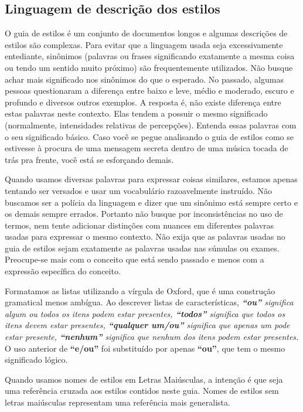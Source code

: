 \subsection*{Linguagem de descrição dos estilos}
O guia de estilos é um conjunto de documentos longos e algumas descrições de estilos são complexas. Para evitar que a linguagem usada seja excessivamente entediante, sinônimos (palavras ou frases significando exatamente a mesma coisa ou tendo um sentido muito próximo) são frequentemente utilizados. Não busque achar mais significado nos sinônimos do que o esperado. No passado, algumas pessoas questionaram a diferença entre baixo e leve, médio e moderado, escuro e profundo e diversos outros exemplos. A resposta é, não existe diferença entre estas palavras neste contexto. Elas tendem a possuir o mesmo significado (normalmente, intensidades relativas de percepções). Entenda essas palavras com o seu significado básico. Caso você se pegue analisando o guia de estilos como se estivesse à procura de uma mensagem secreta dentro de uma música tocada de trás pra frente, você está se esforçando demais.

Quando usamos diversas palavras para expressar coisas similares, estamos apenas tentando ser versados e usar um vocabulário razoavelmente instruído. Não buscamos ser a polícia da linguagem e dizer que um sinônimo está sempre certo e os demais sempre errados. Portanto não busque por inconsistências no uso de termos, nem tente adicionar distinções com nuances em diferentes palavras usadas para expressar o mesmo contexto. Não exija que as palavras usadas no guia de estilos sejam exatamente as palavras usadas nas súmulas ou exames. Preocupe-se mais com o conceito que está sendo passado e menos com a expressão específica do conceito.

Formatamos as listas utilizando a vírgula de Oxford, que é uma construção gramatical menos ambígua. Ao descrever listas de características, \textit{\textbf{“ou”} significa algum ou todos os itens podem estar presentes, \textbf{“todos”} significa que todos os itens devem estar presentes, \textbf{“qualquer um/ou”} significa que apenas um pode estar presente, \textbf{“nenhum”} significa que nenhum dos itens podem estar presentes.} O uso anterior de \textbf{“e/ou”} foi substituído por apenas \textbf{“ou”}, que tem o mesmo significado lógico.

Quando usamos nomes de estilos em Letras Maiúsculas, a intenção é que seja uma referência cruzada aos estilos contidos neste guia. Nomes de estilos sem letras maiúsculas representam uma referência mais generalista.

